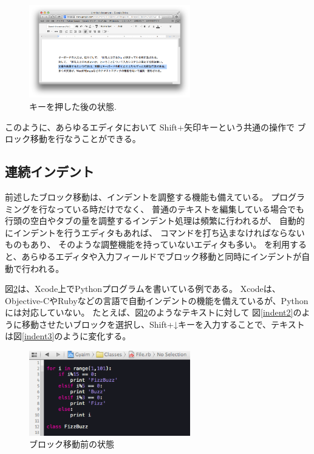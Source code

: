 \begin{figure}[H]
\centerline{\includegraphics[width=70mm,bb=0 0 935 542]{figures/block5.png}}
\caption{キーを押した後の状態.}
\label{move4}
\end{figure}

このように、あらゆるエディタにおいて
Shift+矢印キーという共通の操作で
ブロック移動を行なうことができる。

\subsection{連続インデント}

前述したブロック移動は、インデントを調整する機能も備えている。
プログラミングを行なっている時だけでなく、
普通のテキストを編集している場合でも
行頭の空白やタブの量を調整するインデント処理は頻繁に行われるが、
自動的にインデントを行うエディタもあれば、
コマンドを打ち込まなければならないものもあり、
そのような調整機能を持っていないエディタも多い。
{\system}を利用すると、あらゆるエディタや入力フィールドでブロック移動と同時にインデントが自動で行われる。

図\ref{indent1}は、Xcode上でPythonプログラムを書いている例である。
Xcodeは、Objective-CやRubyなどの言語で自動インデントの機能を備えているが、Pythonには対応していない。
たとえば、図\ref{indent1}のようなテキストに対して
図\ref{indent2}のように移動させたいブロックを選択し、Shift+↓キーを入力することで、テキストは図\ref{indent3}のように変化する。

\begin{figure}[H]
\centerline{\includegraphics[width=70mm,bb=0 0 360 190]{figures/indent1.png}}
\caption{ブロック移動前の状態}
\label{indent1}
\end{figure}

